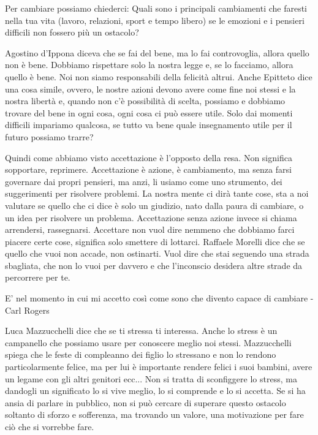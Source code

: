 \documentclass[12pt]{book} %
\begin{document}
Per cambiare possiamo chiederci: Quali sono i principali cambiamenti che faresti nella tua vita (lavoro, relazioni,
sport e tempo libero) se le emozioni e i pensieri difficili non fossero più un ostacolo?

Agostino d'Ippona diceva che se fai del bene, ma lo fai controvoglia, allora quello non è bene. Dobbiamo rispettare solo
la nostra legge e, se lo facciamo, allora quello è bene. Noi non siamo responsabili della felicità altrui. Anche
Epitteto dice una cosa simile, ovvero, le nostre azioni devono avere come fine noi stessi e la nostra libertà e, quando
non c'è possibilità di scelta, possiamo e dobbiamo trovare del bene in ogni cosa, ogni cosa ci può
essere utile. Solo dai momenti difficili impariamo qualcosa, se tutto va bene quale insegnamento utile per il futuro
possiamo trarre?

Quindi come abbiamo visto accettazione è l'opposto della resa. Non significa sopportare, reprimere.
Accettazione è azione, è cambiamento, ma senza farsi governare dai propri pensieri, ma anzi, li usiamo come uno
strumento, dei suggerimenti per risolvere problemi. La nostra mente ci dirà tante cose, sta a noi valutare se quello
che ci dice è solo un giudizio, nato dalla paura di cambiare, o un idea per risolvere un problema. Accettazione senza
azione invece si chiama arrendersi, rassegnarsi. Accettare non vuol dire nemmeno che dobbiamo farci piacere certe cose,
significa solo smettere di lottarci.
Raffaele Morelli dice che se quello che vuoi non accade, non ostinarti. Vuol dire che stai seguendo una strada sbagliata, che non lo vuoi per davvero e che l'inconscio desidera altre strade da percorrere per te. 

E' nel momento in cui mi accetto così come sono che divento capace di cambiare - Carl Rogers

Luca Mazzucchelli dice che se ti stressa ti interessa. Anche lo stress è un campanello che possiamo usare per conoscere
meglio noi stessi. Mazzucchelli spiega che le feste di compleanno dei figlio lo stressano e non lo rendono
particolarmente felice, ma per lui è importante rendere felici i suoi bambini, avere un legame con gli altri genitori
ecc... Non si tratta di sconfiggere lo stress, ma dandogli un significato lo si vive meglio, lo si comprende e lo si
accetta. Se si ha ansia di parlare in pubblico, non si può cercare di superare questo ostacolo soltanto di sforzo e
sofferenza, ma trovando un valore, una motivazione per fare ciò che si vorrebbe fare.
\end{document}
